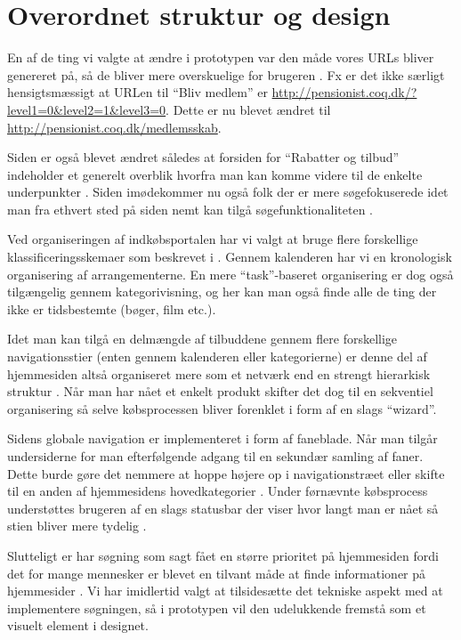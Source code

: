 \chapter{Overordnet struktur og design}

En af de ting vi valgte at ændre i prototypen var den måde vores URLs
bliver genereret på, så de bliver mere overskuelige for brugeren \cite[s.
385]{Benyon2010}. Fx er det ikke særligt hensigtsmæssigt at URLen til ``Bliv
medlem'' er \url{http://pensionist.coq.dk/?level1=0&level2=1&level3=0}. Dette
er nu blevet ændret til \url{http://pensionist.coq.dk/medlemsskab}.

Siden er også blevet ændret således at forsiden for ``Rabatter og tilbud''
indeholder et generelt overblik hvorfra man kan komme videre til de enkelte
underpunkter \cite[s. 386]{Benyon2010}. Siden imødekommer nu også folk der
er mere søgefokuserede idet man fra ethvert sted på siden nemt kan tilgå
søgefunktionaliteten \cite[s. 386]{Benyon2010}.

Ved organiseringen af indkøbsportalen har vi valgt at bruge flere forskellige
klassificeringsskemaer som beskrevet i \cite[s. 392--394]{Benyon2010}.
Gennem kalenderen har vi en kronologisk organisering af arrangementerne.
En mere ``task''-baseret organisering er dog også tilgængelig gennem
kategorivisning, og her kan man også finde alle de ting der ikke er
tidsbestemte (bøger, film etc.).

Idet man kan tilgå en delmængde af tilbuddene gennem flere forskellige
navigationsstier (enten gennem kalenderen eller kategorierne) er denne del af
hjemmesiden altså organiseret mere som et netværk end en strengt hierarkisk
struktur \cite[s. 396]{Benyon2010}. Når man har nået et enkelt produkt
skifter det dog til en sekventiel organisering så selve købsprocessen bliver
forenklet i form af en slags ``wizard''.

Sidens globale navigation er implementeret i form af faneblade. Når
man tilgår undersiderne for man efterfølgende adgang til en sekundær
samling af faner. Dette burde gøre det nemmere at hoppe højere op i
navigationstræet eller skifte til en anden af hjemmesidens hovedkategorier
\cite[s. 402]{Benyon2010}. Under førnævnte købsprocess understøttes
brugeren af en slags statusbar der viser hvor langt man er nået så stien
bliver mere tydelig \cite[s. 403]{Benyon2010}.

Slutteligt er har søgning som sagt fået en større prioritet på
hjemmesiden fordi det for mange mennesker er blevet en tilvant måde at finde
informationer på hjemmesider \cite[s. 405]{Benyon2010}. Vi har imidlertid
valgt at tilsidesætte det tekniske aspekt med at implementere søgningen, så
i prototypen vil den udelukkende fremstå som et visuelt element i designet.
